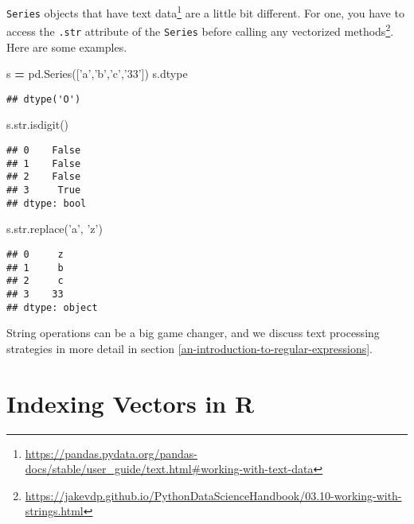 \documentclass[12pt,krantz2]{krantz}
\makeatletter
\newenvironment{Shaded}{\begin{snugshade}}{\end{snugshade}}
\newcommand{\BuiltInTok}[1]{#1}
\newcommand{\NormalTok}[1]{#1}
\newcommand{\OperatorTok}[1]{\textcolor[rgb]{0.43,0.43,0.43}{\textbf{#1}}}
\newcommand{\StringTok}[1]{\textcolor[rgb]{0.5,0.5,0.5}{#1}}
\renewcommand{\href}[2]{#2\footnote{\url{#1}}}
\newenvironment{kframe}{%
\medskip{}
\setlength{\fboxsep}{.8em}
 \def\at@end@of@kframe{}%
 \ifinner\ifhmode%
  \def\at@end@of@kframe{\end{minipage}}%
  \begin{minipage}{\columnwidth}%
 \fi\fi%
 \def\FrameCommand##1{\hskip\@totalleftmargin \hskip-\fboxsep
 \colorbox{shadecolor}{##1}\hskip-\fboxsep
     \hskip-\linewidth \hskip-\@totalleftmargin \hskip\columnwidth}%
 \MakeFramed {\advance\hsize-\width
   \@totalleftmargin\z@ \linewidth\hsize
   \@setminipage}}%
 {\par\unskip\endMakeFramed%
 \at@end@of@kframe}
\renewenvironment{Shaded}{\begin{kframe}}{\end{kframe}}
\makeatother
\begin{document}
\texttt{Series} objects that have \href{https://pandas.pydata.org/pandas-docs/stable/user_guide/text.html\#working-with-text-data}{text data} are a little bit different. For one, you have to access the \texttt{.str} attribute of the \texttt{Series} before calling any \href{https://jakevdp.github.io/PythonDataScienceHandbook/03.10-working-with-strings.html}{vectorized methods}. Here are some examples.

\begin{Shaded}
\begin{Highlighting}[]
\NormalTok{s }\OperatorTok{=}\NormalTok{ pd.Series([}\StringTok{'a'}\NormalTok{,}\StringTok{'b'}\NormalTok{,}\StringTok{'c'}\NormalTok{,}\StringTok{'33'}\NormalTok{])}
\NormalTok{s.dtype}
\end{Highlighting}
\end{Shaded}

\begin{verbatim}
## dtype('O')
\end{verbatim}

\begin{Shaded}
\begin{Highlighting}[]
\NormalTok{s.}\BuiltInTok{str}\NormalTok{.isdigit()}
\end{Highlighting}
\end{Shaded}

\begin{verbatim}
## 0    False
## 1    False
## 2    False
## 3     True
## dtype: bool
\end{verbatim}

\begin{Shaded}
\begin{Highlighting}[]
\NormalTok{s.}\BuiltInTok{str}\NormalTok{.replace(}\StringTok{'a'}\NormalTok{, }\StringTok{'z'}\NormalTok{)}
\end{Highlighting}
\end{Shaded}

\begin{verbatim}
## 0     z
## 1     b
## 2     c
## 3    33
## dtype: object
\end{verbatim}

String operations can be a big game changer, and we discuss text processing strategies in more detail in section \ref{an-introduction-to-regular-expressions}.

\hypertarget{indexing-vectors-in-r}{%
\section{Indexing Vectors in R}\label{indexing-vectors-in-r}}
\end{document}
